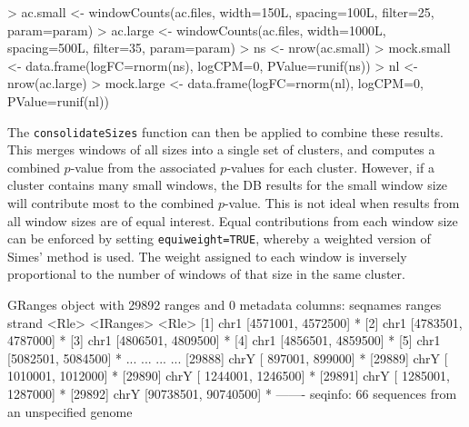 \documentclass[12pt]{report}
\renewenvironment{Schunk}{\vspace{0pt}}{\vspace{0pt}}
\newcommand{\code}[1]{{\small\texttt{#1}}}
\begin{document}
\begin{Schunk}
\begin{Sinput}
> ac.small <- windowCounts(ac.files, width=150L, spacing=100L, filter=25, param=param)
> ac.large <- windowCounts(ac.files, width=1000L, spacing=500L, filter=35, param=param)
> ns <- nrow(ac.small)
> mock.small <- data.frame(logFC=rnorm(ns), logCPM=0, PValue=runif(ns)) 
> nl <- nrow(ac.large)
> mock.large <- data.frame(logFC=rnorm(nl), logCPM=0, PValue=runif(nl)) 
\end{Sinput}
\end{Schunk}

The \code{consolidateSizes} function can then be applied to combine these results.
This merges windows of all sizes into a single set of clusters, and computes a combined $p$-value from the associated $p$-values for each cluster.
However, if a cluster contains many small windows, the DB results for the small window size will contribute most to the combined $p$-value.
This is not ideal when results from all window sizes are of equal interest.
Equal contributions from each window size can be enforced by setting \code{equiweight=TRUE}, whereby a weighted version of Simes' method \citep{benjamini1997} is used.
The weight assigned to each window is inversely proportional to the number of windows of that size in the same cluster.

\begin{Schunk}
\begin{Soutput}
GRanges object with 29892 ranges and 0 metadata columns:
          seqnames               ranges strand
             <Rle>            <IRanges>  <Rle>
      [1]     chr1   [4571001, 4572500]      *
      [2]     chr1   [4783501, 4787000]      *
      [3]     chr1   [4806501, 4809500]      *
      [4]     chr1   [4856501, 4859500]      *
      [5]     chr1   [5082501, 5084500]      *
      ...      ...                  ...    ...
  [29888]     chrY [  897001,   899000]      *
  [29889]     chrY [ 1010001,  1012000]      *
  [29890]     chrY [ 1244001,  1246500]      *
  [29891]     chrY [ 1285001,  1287000]      *
  [29892]     chrY [90738501, 90740500]      *
  -------
  seqinfo: 66 sequences from an unspecified genome
\end{Soutput}
\end{Schunk}
\end{document}
